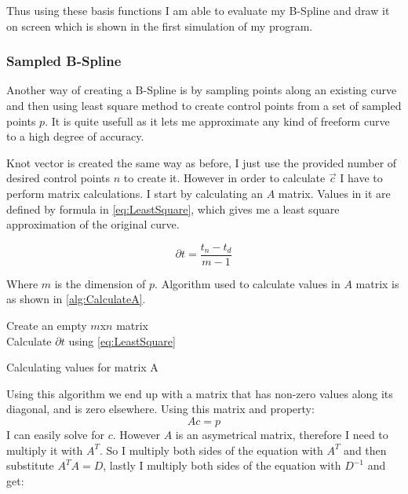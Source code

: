 \documentclass[a4paper,12pt]{extarticle}
\begin{document}
Thus using these basis functions I am able to evaluate my B-Spline and draw it on screen which is shown in the first simulation of my program.

\subsubsection{Sampled B-Spline}
Another way of creating a B-Spline is by sampling points along an existing curve and then using least square method to create control points from a set of sampled points $p$. It is quite usefull as it lets me approximate any kind of freeform curve to a high degree of accuracy.

Knot vector is created the same way as before, I just use the provided number of desired control points $n$ to create it. However in order to calculate $\vec{c}$ I have to perform matrix calculations. I start by calculating an $A$ matrix. Values in it are defined by formula in \cref{eq:LeastSquare}, which gives me a least square approximation of the original curve.

\begin{equation}
\partial t = \frac{t_n - t_d}{m-1}
\label{eq:LeastSquare}
\end{equation}

Where $m$ is the dimension of $p$. Algorithm used to calculate values in $A$ matrix is as shown in \cref{alg:CalculateA}.

\begin{algorithm}
  Create an empty $m$x$n$ matrix\\
  Calculate $\partial t$ using \eqref{eq:LeastSquare}\\
  \caption{Calculating values for matrix A}
  \label{alg:CalculateA}
\end{algorithm}

Using this algorithm we end up with a matrix that has non-zero values along its diagonal, and is zero elsewhere. Using this matrix and property: $$Ac = p$$ I can easily solve for $c$. However $A$ is an asymetrical matrix, therefore I need to multiply it with $A^T$. So I multiply both sides of the equation with $A^T$ and then substitute $A^TA=D$, lastly I multiply both sides of the equation with $D^{-1}$ and get:
\end{document}
